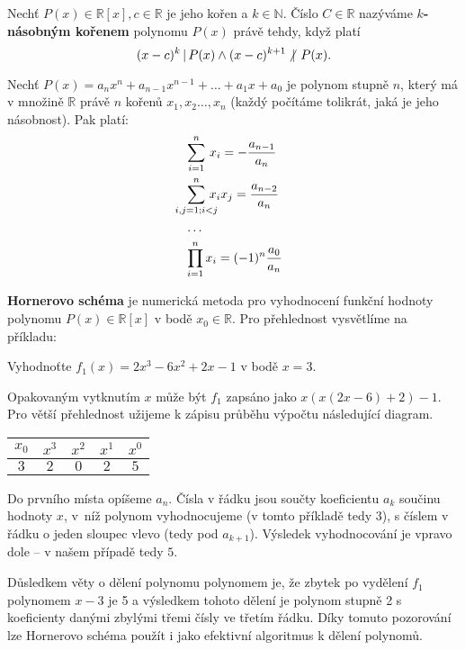 \begin{definition}
  Nechť $P(x) \in \mathbb R [x], c \in \mathbb R$ je jeho kořen a $k \in \mathbb N$. Číslo $C \in \mathbb R$ nazýváme \textbf{$k$-násobným kořenem} polynomu $P(x)$ právě tehdy, když platí
  \[
    (x-c)^k \, | \, P(x) \land (x-c)^{k+1} \,\centernot |\,  P(x).
  \]
\end{definition}

\begin{veta}
  Nechť $P(x)=a_nx^n+a_{n-1}x^{n-1}+\dots + a_1x+a_0$ je polynom stupně $n$, který má v množině $\mathbb R$ právě $n$ kořenů $x_1,x_2\dots,x_n$ (každý počítáme tolikrát, jaká je jeho násobnost). Pak platí:
  \begin{align*}
    &\smashoperator[l]{\sum_{i=1}^n} \, x_i = -\frac{a_{n-1}}{a_n} \\
    &\smashoperator[l]{\sum_{i,j=1; i<j}^{n}}\!\!\!\!\! x_ix_j= \frac{a_{n-2}}{a_n} \\
    & \hdots \\
    &\smashoperator[l]{\prod_{i=1}^n}x_i=(-1)^n\frac{a_0}{a_n}
  \end{align*}
\end{veta}

\begin{pozn}
  \textbf{Hornerovo schéma} je numerická metoda pro vyhodnocení funkční hodnoty polynomu $P(x) \in \mathbb R [x]$ v bodě $ x_0 \in \mathbb R$. Pro přehlednost vysvětlíme na příkladu:
  \begin{center}
  Vyhodnoťte $f_{1}(x)=2x^{3}-6x^{2}+2x-1$ v bodě $x=3$.
  \end{center}
  Opakovaným vytknutím $x$ může být $f_{1}$ zapsáno jako $x(x(2x-6)+2)-1$. Pro větší přehlednost užijeme k zápisu průběhu výpočtu následující diagram.
  \begin{center}
    \begin{tabular}{ c|c c c c }
        $x_{0}$ & $x^{3}$ & $x^{2}$ & $x^{1}$ & $x^{0}$\\
        \hline
        $3$ & $2$ & $0$ & $2$ & $5$
    \end{tabular}
  \end{center}
  Do prvního místa opíšeme $a_n$. Čísla v řádku jsou součty koeficientu $a_k$ součinu hodnoty $x$, v~níž polynom vyhodnocujeme (v tomto příkladě tedy $3$), s číslem v řádku o jeden sloupec vlevo (tedy pod $a_{k+1}$). Výsledek vyhodnocování je vpravo dole – v našem případě tedy $5$.

  Důsledkem věty o dělení polynomu polynomem je, že zbytek po vydělení $f_1$ polynomem $x-3$ je 5 a výsledkem tohoto dělení je polynom stupně 2 s koeficienty danými zbylými třemi čísly ve třetím řádku. Díky tomuto pozorování lze Hornerovo schéma použít i jako efektivní algoritmus k dělení polynomů.
\end{pozn}

